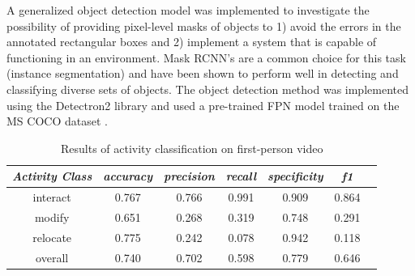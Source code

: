\documentclass[12pt]{report}
\begin{document}
A generalized object detection model was implemented to investigate the possibility of providing pixel-level masks of objects to 1) avoid the errors in the annotated rectangular boxes and 2) implement a system that is capable of functioning in an environment. Mask RCNN's are a common choice for this task (instance segmentation) and have been shown to perform well in detecting and classifying diverse sets of objects\cite{cheng2020panoptic, chen2019tensormask, michaelis2018one}. The object detection method was implemented using the Detectron2 library and used a pre-trained FPN model trained on the MS COCO dataset \cite{wu2019detectron2}.

\begin{table}
\caption{Results of activity classification on first-person video}
\begin{center}
\begin{tabular}{|c|c|c|c|c|c|c|}
\hline 
\textbf{\textit{Activity Class}} & \textbf{\textit{accuracy}} & \textbf{\textit{precision}} & \textbf{\textit{recall}} & \textbf{\textit{specificity}} & \textbf{\textit{f1}} \\
\hline \hline
interact & 0.767 & 0.766 & 0.991 & 0.909 & 0.864 \\
modify & 0.651 & 0.268 & 0.319 & 0.748 & 0.291 \\
relocate & 0.775 & 0.242 & 0.078 & 0.942 & 0.118 \\
\hline
overall & 0.740  & 0.702 & 0.598 & 0.779 & 0.646  \\
\hline
\end{tabular}
\label{results}
\end{center}
\end{table}
\end{document}
